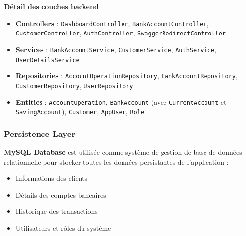 \documentclass[10pt]{article}
\begin{document}
\begin{tcolorbox}[
    enhanced,
    colback=white,
    colframe=bordercolor,
    arc=5pt,
    boxrule=1pt
]
    \begin{center}
        \textbf{\large\sffamily\textcolor{secondary}{Détail des couches backend}}
    \end{center}
    
    \begin{itemize}[leftmargin=20pt, itemsep=5pt]
        \item \textbf{Controllers} : \texttt{DashboardController}, \texttt{BankAccountController}, \texttt{CustomerController}, \texttt{AuthController}, \texttt{SwaggerRedirectController}
        
        \item \textbf{Services} : \texttt{BankAccountService}, \texttt{CustomerService}, \texttt{AuthService}, \texttt{UserDetailsService}
        
        \item \textbf{Repositories} : \texttt{AccountOperationRepository}, \texttt{BankAccountRepository}, \texttt{CustomerRepository}, \texttt{UserRepository}
        
        \item \textbf{Entities} : \texttt{AccountOperation}, \texttt{BankAccount} (avec \texttt{CurrentAccount} et \texttt{SavingAccount}), \texttt{Customer}, \texttt{AppUser}, \texttt{Role}
    \end{itemize}
\end{tcolorbox}

\vspace{0.8cm}

\subsubsection{Persistence Layer}

\begin{secondarybox}[title=Système de persistance]

    \textbf{MySQL Database} est utilisée comme système de gestion de base de données relationnelle 
    pour stocker toutes les données persistantes de l'application :
    \begin{itemize}[leftmargin=15pt, itemsep=2pt]
        \item Informations des clients
        \item Détails des comptes bancaires
        \item Historique des transactions
        \item Utilisateurs et rôles du système
    \end{itemize}
\end{secondarybox}
\end{document}
